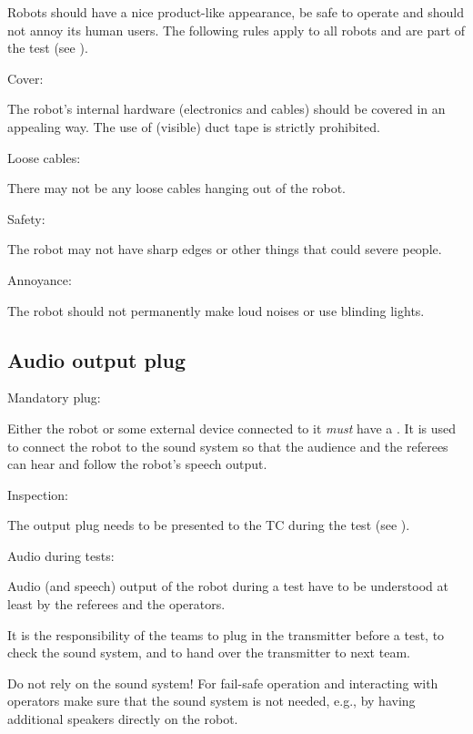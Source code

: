 Robots should have a nice product-like appearance, be safe to operate and should not annoy its human users.
The following rules apply to all robots and are part of the  test (see ). 
\begin{enumerate}
{\bf\item Cover:} The robot's internal hardware (electronics and cables) should be covered in an appealing way.
The use of (visible) duct tape is strictly prohibited.
{\bf\item Loose cables:} There may not be any loose cables hanging out of the robot. 
{\bf\item Safety:} The robot may not have sharp edges or other things that could severe people.
{\bf\item Annoyance:} The robot should not permanently make loud noises or use blinding lights.
\end{enumerate}




\subsection{Audio output plug}\label{rule:roobt_audio_out}

\begin{enumerate}
{\bf\item Mandatory plug:} Either the robot or some external device connected to it \emph{must} have a . 
It is used to connect the robot to the sound system so that the audience and the referees can hear and follow the robot's speech output.
{\bf\item Inspection:} The output plug needs to be presented to the TC during the  test (see ).
{\bf\item Audio during tests:} Audio (and speech) output of the robot during a test have to be understood at least by the referees and the operators.
\begin{compactitem}
\item It is the responsibility of the teams to plug in the transmitter before a test, 
to check the sound system, 
and to hand over the transmitter to next team.
\item Do not rely on the sound system! 
For fail-safe operation and interacting with operators make sure that the sound system is not needed, e.g., 
by having additional speakers directly on the robot.
\end{compactitem}
\end{enumerate}

